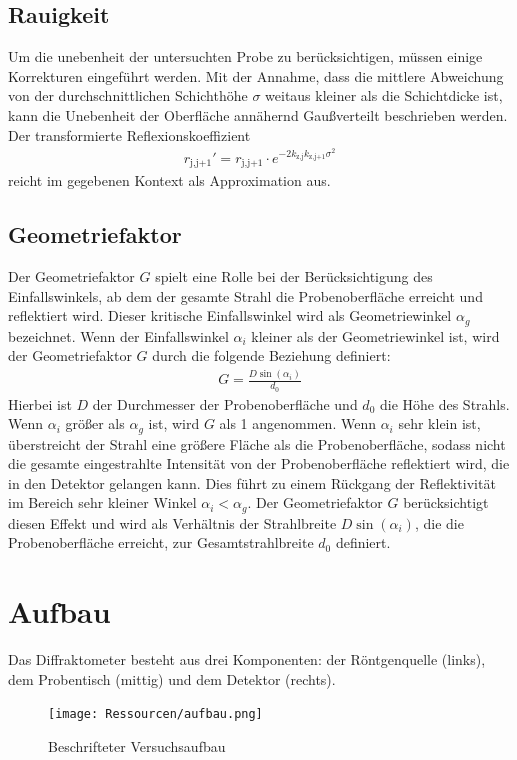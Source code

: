 \documentclass[12pt]{article}
\begin{document}
\subsection{Rauigkeit}{\label{subsec:rauigkeit}}
Um die unebenheit der untersuchten Probe zu berücksichtigen, müssen einige Korrekturen eingeführt werden.
Mit der Annahme, dass die mittlere Abweichung von der durchschnittlichen Schichthöhe $\sigma$ weitaus kleiner als die Schichtdicke ist, kann die Unebenheit der Oberfläche annähernd Gaußverteilt beschrieben werden.
Der transformierte Reflexionskoeffizient
\begin{align}
    r_\text{j,j+1}'=r_\text{j,j+1}\cdot e^{-2k_\text{z,j}k_\text{z,j+1}\sigma^2}
\end{align}
reicht im gegebenen Kontext als Approximation aus.
\subsection{Geometriefaktor}
Der Geometriefaktor $ G $ spielt eine Rolle bei der Berücksichtigung des Einfallswinkels, ab dem der gesamte Strahl die Probenoberfläche erreicht und reflektiert wird. Dieser kritische Einfallswinkel wird als Geometriewinkel $ \alpha_g $ bezeichnet. Wenn der Einfallswinkel $ \alpha_i $ kleiner als der Geometriewinkel ist, wird der Geometriefaktor $ G $ durch die folgende Beziehung definiert:
\begin{align}
G = \frac{D \sin(\alpha_i)}{d_0}\label{eqn:G}
\end{align}
Hierbei ist $ D $ der Durchmesser der Probenoberfläche und $ d_0 $ die Höhe des Strahls. Wenn $ \alpha_i $ größer als $ \alpha_g $ ist, wird $ G $ als 1 angenommen.
Wenn $ \alpha_i $ sehr klein ist, überstreicht der Strahl eine größere Fläche als die Probenoberfläche, sodass nicht die gesamte eingestrahlte Intensität von der Probenoberfläche reflektiert wird, die in den Detektor gelangen kann. Dies führt zu einem Rückgang der Reflektivität im Bereich sehr kleiner Winkel $ \alpha_i < \alpha_g $. Der Geometriefaktor $ G $ berücksichtigt diesen Effekt und wird als Verhältnis der Strahlbreite $ D \sin(\alpha_i) $, die die Probenoberfläche erreicht, zur Gesamtstrahlbreite $ d_0 $ definiert.
\section{Aufbau}
Das Diffraktometer besteht aus drei Komponenten: der Röntgenquelle (links), dem Probentisch (mittig) und dem Detektor (rechts).
\begin{figure}[H]
  \centering
  \texttt{[image: Ressourcen/aufbau.png]}
  \caption{Beschrifteter Versuchsaufbau}\label{fig:5}
\end{figure}
\end{document}
